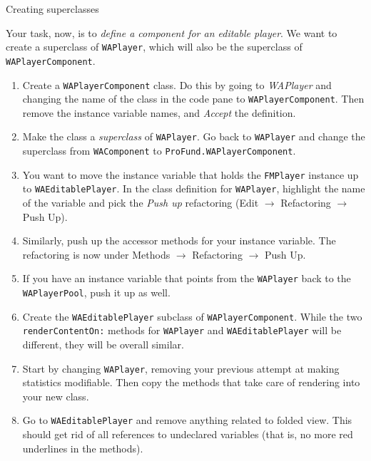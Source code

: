 \documentclass[a4paper,10pt]{scrartcl}
\begin{document}
\begin{exercise}{Creating superclasses}

Your task, now, is to \emph{define a component for an editable player}.
We want to create a superclass of \texttt{WAPlayer}, which will also be
the superclass of \texttt{WAPlayerComponent}.

\begin{enumerate}
\item Create a \texttt{WAPlayerComponent} class.  Do this by going to
  \emph{WAPlayer} and changing the name of the class in the code pane to
  \texttt{WAPlayerComponent}.  Then remove the instance variable names,
  and \emph{Accept} the definition.

\item Make the class a \emph{superclass} of \texttt{WAPlayer}.
  Go back to \texttt{WAPlayer} and change the
  superclass from \texttt{WAComponent} to \texttt{ProFund.WAPlayerComponent}.

\item You want to move the instance variable that holds the \texttt{FMPlayer}
  instance up to \texttt{WAEditablePlayer}.  In the class definition for
  \texttt{WAPlayer}, highlight the name of the variable and pick the
  \emph{Push up} refactoring (Edit $\to$ Refactoring $\to$ Push Up).

\item Similarly, push up the accessor methods for your instance variable.
  The refactoring is now under Methods $\to$ Refactoring $\to$
  Push Up.

\item If you have an instance variable that points from the \texttt{WAPlayer}
  back to the \texttt{WAPlayerPool}, push it up as well.

\item Create the \texttt{WAEditablePlayer} subclass of \texttt{WAPlayerComponent}.
While the two \texttt{renderContentOn:} methods for \texttt{WAPlayer}
and \texttt{WAEditablePlayer} will be different, they will be overall similar.

\item Start by changing \texttt{WAPlayer}, removing your previous attempt at making statistics
modifiable.  Then copy the methods that take care of rendering into your new class.

\item Go to \texttt{WAEditablePlayer} and remove anything related to folded view.
This should get rid of all references to undeclared variables (that is, no more
red underlines in the methods).
\end{enumerate}

\end{exercise}
\end{document}
